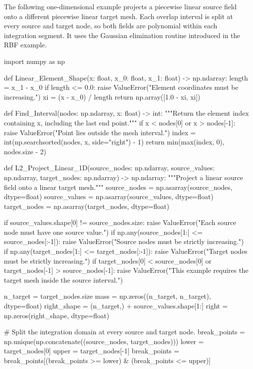 The following one-dimensional example projects a piecewise linear source field
onto a different piecewise linear target mesh. Each overlap interval is split
at every source and target node, so both fields are polynomial within each
integration segment. It uses the Gaussian elimination routine introduced in
the RBF example.

\begin{python}
import numpy as np


def Linear_Element_Shape(x: float, x_0: float, x_1: float) -> np.ndarray:
    length = x_1 - x_0
    if length <= 0.0:
        raise ValueError("Element coordinates must be increasing.")
    xi = (x - x_0) / length
    return np.array([1.0 - xi, xi])


def Find_Interval(nodes: np.ndarray, x: float) -> int:
    """Return the element index containing x, including the last end point."""
    if x < nodes[0] or x > nodes[-1]:
        raise ValueError("Point lies outside the mesh interval.")
    index = int(np.searchsorted(nodes, x, side="right") - 1)
    return min(max(index, 0), nodes.size - 2)


def L2_Project_Linear_1D(source_nodes: np.ndarray,
                         source_values: np.ndarray,
                         target_nodes: np.ndarray) -> np.ndarray:
    """Project a linear source field onto a linear target mesh."""
    source_nodes = np.asarray(source_nodes, dtype=float)
    source_values = np.asarray(source_values, dtype=float)
    target_nodes = np.asarray(target_nodes, dtype=float)

    if source_values.shape[0] != source_nodes.size:
        raise ValueError("Each source node must have one source value.")
    if np.any(source_nodes[1:] <= source_nodes[:-1]):
        raise ValueError("Source nodes must be strictly increasing.")
    if np.any(target_nodes[1:] <= target_nodes[:-1]):
        raise ValueError("Target nodes must be strictly increasing.")
    if target_nodes[0] < source_nodes[0] or target_nodes[-1] > source_nodes[-1]:
        raise ValueError("This example requires the target mesh inside the source interval.")

    n_target = target_nodes.size
    mass = np.zeros((n_target, n_target), dtype=float)
    right_shape = (n_target,) + source_values.shape[1:]
    right = np.zeros(right_shape, dtype=float)

    # Split the integration domain at every source and target node.
    break_points = np.unique(np.concatenate((source_nodes, target_nodes)))
    lower = target_nodes[0]
    upper = target_nodes[-1]
    break_points = break_points[(break_points >= lower) & (break_points <= upper)]


\end{python}
